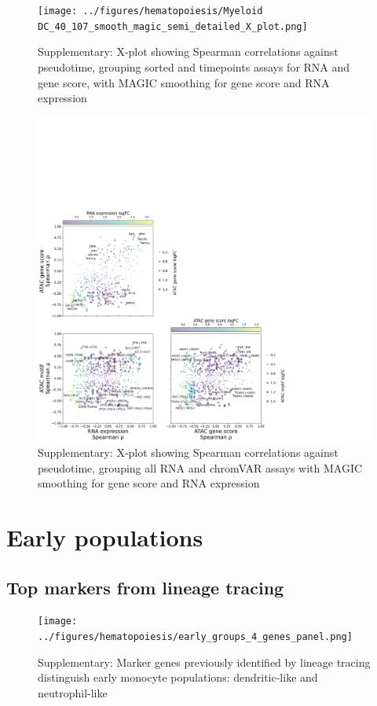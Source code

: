\documentclass[a4paper]{article}
\begin{document}
\begin{figure}[!htb]
  \centering
  \texttt{[image: ../figures/hematopoiesis/Myeloid DC\_40\_107\_smooth\_magic\_semi\_detailed\_X\_plot.png]}
  \caption{Supplementary: X-plot showing Spearman correlations against pseudotime, grouping sorted and timepoints assays for RNA and gene score, with MAGIC smoothing for gene score and RNA expression}
\end{figure}

\begin{figure}[!htb]
  \centering
  \includegraphics[width=\textwidth]{../figures/hematopoiesis/Myeloid DC_40_107_smooth_magic_grouped_X_plot.png}
  \caption{Supplementary: X-plot showing Spearman correlations against pseudotime, grouping all RNA and chromVAR assays with MAGIC smoothing for gene score and RNA expression}
\end{figure}


\FloatBarrier
\section{Early populations}

\subsection{Top markers from lineage tracing}
\begin{figure}[!htb]
  \centering
  \texttt{[image: ../figures/hematopoiesis/early\_groups\_4\_genes\_panel.png]}
  \caption{Supplementary: Marker genes previously identified by lineage tracing distinguish early monocyte populations: dendritic-like and neutrophil-like}
\end{figure}
\end{document}
